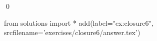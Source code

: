 
\begin{ex} 
  \label{ex:closure6}
  
  \qed
\end{ex} 
\begin{python0}
from solutions import *
add(label="ex:closure6",
    srcfilename='exercises/closure6/answer.tex') 
\end{python0}
